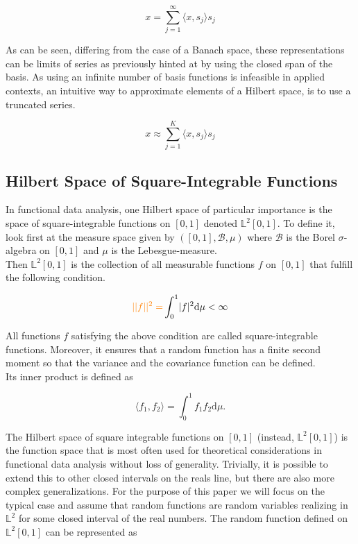 \documentclass[11pt,twoside,a4paper]{article}
\begin{document}
	\begin{equation}
		x = \sum_{j = 1}^{\infty}{\langle x, s_j \rangle}s_j
	\end{equation}
	
	As can be seen, differing from the case of a Banach space, these representations can be limits of series as previously hinted at by using the closed span of the basis. As using an infinite number of basis functions is infeasible in applied contexts, an intuitive way to approximate elements of a Hilbert space, is to use a truncated series.
	
	\begin{equation}
		x \approx \sum_{j = 1}^{K}{\langle x, s_j \rangle}s_j
	\end{equation}
	
	\subsection{Hilbert Space of Square-Integrable Functions}
	In functional data analysis, one Hilbert space of particular importance is the space of square-integrable functions on $[0,1]$ denoted $\mathbb{L}^2[0,1]$. To define it, look first at the measure space given by $([0,1], \mathcal{B}, \mu)$ where $\mathcal{B}$ is the Borel $\sigma$-algebra on $[0,1]$ and $\mu$ is the Lebesgue-measure.\\
	Then $\mathbb{L}^2[0,1]$ is the collection of all measurable functions $f$ on $[0,1]$ that fulfill the following condition.
	
	\begin{equation}
		{\color{orange} \lvert \lvert f \rvert \rvert^2 =} \int_{0}^{1} \lvert f \rvert^2 \mathrm{d}\mu < \infty
	\end{equation}
	
	All functions $f$ satisfying the above condition are called square-integrable functions. Moreover, it ensures that a random function has a finite second moment so that the variance and the covariance function can be defined.\\
	Its inner product is defined as
	
	\begin{equation}
		\langle f_1, f_2 \rangle = \int_{0}^{1} f_1 f_2 \mathrm{d}\mu.
	\end{equation}
	
	The Hilbert space of square integrable functions on $[0,1]$ {\color{orange} (instead, $\mathbb{L}^2[0,1]$)} is the function space that is most often used for theoretical considerations in functional data analysis  {\color{orange} without loss of generality}. Trivially, it is possible to extend this to other closed intervals on the reals line, but there are also more complex generalizations. For the purpose of this paper we will focus on the typical case and assume that random functions are random variables realizing in $\mathbb{L}^2$ for some closed interval of the real numbers. The random function defined on $\mathbb{L}^2[0,1]$ can be represented as
	
\end{document}

